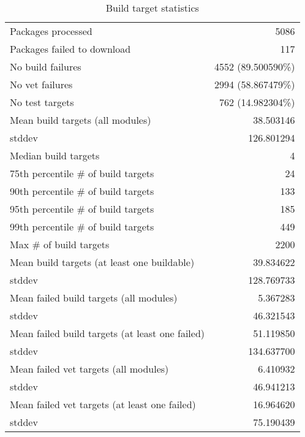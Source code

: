 \begin{table}[ht]
\caption{Build target statistics}
\label{table:build}
\begin{tabular}{|l|r|}
 \hline
  Packages processed & 5086 \\
  Packages failed to download & 117 \\
  No build failures & 4552 (89.500590\%) \\
  No vet failures & 2994 (58.867479\%) \\
  No test targets & 762 (14.982304\%) \\
 \hline
  Mean build targets (all modules)& 38.503146 \\
  stddev & 126.801294 \\
  Median build targets & 4 \\
  75th percentile \# of build targets & 24 \\
  90th percentile \# of build targets & 133 \\
  95th percentile \# of build targets & 185 \\
  99th percentile \# of build targets & 449 \\
  Max \# of build targets & 2200 \\
 \hline
  Mean build targets (at least one buildable)& 39.834622 \\
  stddev & 128.769733 \\
 \hline
  Mean failed build targets (all modules)& 5.367283 \\
  stddev & 46.321543 \\
 \hline
  Mean failed build targets (at least one failed)& 51.119850 \\
  stddev & 134.637700 \\
 \hline
  Mean failed vet targets (all modules)& 6.410932 \\
  stddev & 46.941213 \\
 \hline
  Mean failed vet targets (at least one failed)& 16.964620 \\
  stddev & 75.190439 \\
 \hline
\end{tabular}
\end{table}

